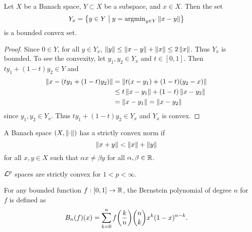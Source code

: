 \begin{theorem}
    Let $X$ be a Banach space, $Y\subset X$ be a subspace, and $x\in X$. Then the 
    set 
    \begin{equation*}
        Y_x = \left\{ y\in Y \;\middle\vert\; y = \operatorname{argmin}_{y\in Y}\left\lVert {x-y} \right\rVert \right\}
    \end{equation*} 
    is a bounded convex set. 
\end{theorem}
\begin{proof}
    Since $0\in Y$, for all $y\in Y_x$, $\left\lVert {y} \right\rVert \leq \left\lVert {x-y} \right\rVert + \left\lVert {x} \right\rVert \leq 2\left\lVert {x} \right\rVert$. 
    Thus $Y_x$ is bounded. To see the convexity, let $y_1,y_2\in Y_x$ and $t\in[0,1]$. 
    Then $ty_1 + (1-t)y_2\in Y$ and
    \begin{equation*}
        \begin{split}
            \norm{x-\pth{ty_1 + (1-t)y_2}} &= \norm{t(x-y_1) + (1-t)(y_2-x)} \\
            &\leq t\norm{x-y_1} + (1-t)\norm{x-y_2} \\
            &= \norm{x-y_1} = \norm{x-y_2}
        \end{split}
    \end{equation*}
    since $y_1,y_2\in Y_x$. Thus $ty_1 + (1-t)y_2\in Y_x$ and $Y_x$ is convex.
\end{proof}

\begin{definition}
    A Banach space $(X,\left\lVert {\cdot} \right\rVert)$ has a strictly convex norm if 
    \begin{equation*}
        \left\lVert {x + y} \right\rVert < \left\lVert {x} \right\rVert + \left\lVert {y} \right\rVert
    \end{equation*}
    for all $x,y\in X$ such that $\alpha x \neq \beta y$ for all $\alpha,\beta\in\mathbb{R}$.
\end{definition}

\begin{remark}
    $\mathcal{L}^p$ spaces are strictly convex for $1<p<\infty$.
\end{remark}

\begin{definition}
    For any bounded function $f:[0,1]\to\mathbb{R}$, the Bernstein polynomial of 
    degree $n$ for $f$ is defined as 
    \begin{equation*}
        B_n(f)(x) = \sum_{k=0}^n f\pth{\frac{k}{n}}\binom{n}{k}x^k(1-x)^{n-k}.
    \end{equation*}
\end{definition}

